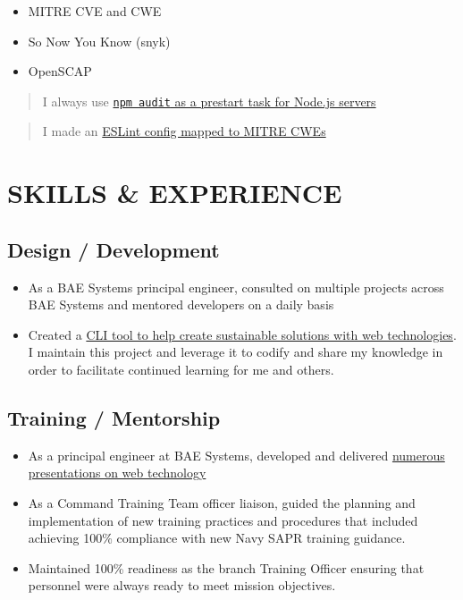 \documentclass[10pt]{article}
\def\tightlist{}
\begin{document}
\begin{itemize}
\tightlist
\item
  MITRE CVE and CWE
\item
  So Now You Know (snyk)
\item
  OpenSCAP
\end{itemize}

\begin{quote}
I always use
\href{https://github.com/jhwohlgemuth/tomo-cli/blob/master/src/commands/create-server/index.js\#L82}{\texttt{npm\ audit}
as a prestart task for Node.js servers}
\end{quote}

\begin{quote}
I made an
\href{https://github.com/omahajs/eslint-config-omaha-prime-grade/blob/master/RULES_FOR_SECURITY.md}{ESLint
config mapped to MITRE CWEs}
\end{quote}

\hypertarget{skills-experience}{%
\section{SKILLS \& EXPERIENCE}\label{skills-experience}}

\hypertarget{design-development}{%
\subsection{Design / Development}\label{design-development}}

\begin{itemize}
\tightlist
\item
  As a BAE Systems principal engineer, consulted on multiple projects
  across BAE Systems and mentored developers on a daily basis
\item
  Created a \href{https://github.com/jhwohlgemuth/tomo-cli}{CLI tool to
  help create sustainable solutions with web technologies}. I maintain
  this project and leverage it to codify and share my knowledge in order
  to facilitate continued learning for me and others.
\end{itemize}

\hypertarget{training-mentorship}{%
\subsection{Training / Mentorship}\label{training-mentorship}}

\begin{itemize}
\tightlist
\item
  As a principal engineer at BAE Systems, developed and delivered
  \href{https://github.com/jhwohlgemuth?utf8=\%E2\%9C\%93\&tab=repositories\&q=slides\&type=source\&language=}{numerous
  presentations on web technology}
\item
  As a Command Training Team officer liaison, guided the planning and
  implementation of new training practices and procedures that included
  achieving 100\% compliance with new Navy SAPR training guidance.
\item
  Maintained 100\% readiness as the branch Training Officer ensuring
  that personnel were always ready to meet mission objectives.
\end{itemize}
\end{document}

